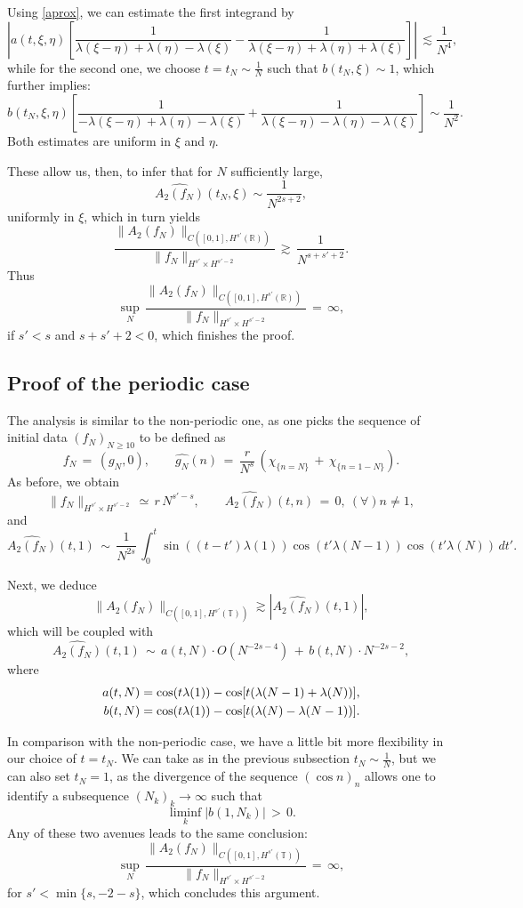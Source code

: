 \documentclass{amsart}
\begin{document}
Using \eqref{aprox}, we can estimate the first integrand by
\[
\left|a(t,\xi,\eta) \left[ \frac{1}{\lambda(\xi - \eta) + \lambda(\eta)- \lambda(\xi)} - \frac{1}{\lambda(\xi - \eta) + \lambda(\eta)+\lambda(\xi)} \right]\right|\,\lesssim \frac{1}{N^4}, 
\]
while for the second one, we choose $t=t_N \sim \frac{1}{N}$ such that $b(t_N,\xi) \sim 1$, which further implies:
\[
b(t_N,\xi,\eta) \left[ \frac{1}{-\lambda(\xi - \eta) + \lambda(\eta)-\lambda(\xi)} + \frac{1}{\lambda(\xi - \eta) - \lambda(\eta)-\lambda(\xi)} \right] \sim \frac{1}{N^2}.\]
Both estimates are uniform in $\xi$ and $\eta$.

These allow us, then, to infer that for $N$ sufficiently large,
\[
\widehat{A_2(f_N)}(t_N,\xi) \sim \frac{1}{N^{2s+2}},
\]
uniformly in $\xi$, which in turn yields
\[
\frac{\|A_2(f_N)\|_{C([0,1], H^{s'}(\mathbb{R}))}}{\|f_N\|_{H^{s'}\times H^{s'-2}}}\,\gtrsim\, \frac{1}{N^{s+s'+2}}.\]
Thus
\[
\sup_N\,\frac{\|A_2(f_N)\|_{C([0,1], H^{s'}(\mathbb{R}))}}{\|f_N\|_{H^{s'}\times H^{s'-2}}}\,=\,\infty,\]
if $s'<s$ and $s+s'+2<0$, which finishes the proof.

\subsection{Proof of the periodic case} The analysis is similar to the non-periodic one, as one picks the sequence of initial data $(f_N)_{N\geq 10}$ to be defined as
\begin{equation}
f_N\,=\,(g_N, 0), \qquad \widehat{g_N}(n)\,=\,\frac{r}{N^s} \,\left(\chi_{\{n=N\}}\,+\,\chi_{\{n=1-N\}}\right).
\label{fnp}
\end{equation}
As before, we obtain
\[
\|f_N\|_{H^{s'}\times H^{s'-2}}\,\simeq\,r\,N^{s'-s}, \qquad \widehat{A_2(f_N)}(t,n)\,=\,0, \ (\forall) n \neq 1,\]
and
\[
\widehat{A_2(f_N)}(t,1)\,\sim\,\frac{1}{N^{2s}}\,\int_0^t \sin((t-t') \lambda(1))\cos(t' \lambda(N-1))\cos(t'\lambda(N))\,dt'.
\]

Next, we deduce
\[
\|A_2(f_N)\|_{C([0,1], H^{s'}(\mathbb{T}))} \gtrsim \left|\widehat{A_2(f_N)}(t,1)\right|,
\]
which will be coupled with
\[
\widehat{A_2(f_N)}(t,1)\,\sim\,a(t,N)\cdot O(N^{-2s-4})\,+\,b(t,N)\cdot N^{-2s-2},
\]
where
\[\aligned
a(t,N)&= \cos (t\lambda(1))-\cos[t(\lambda(N-1) + \lambda(N))],\\ b(t,N)&= \cos (t\lambda(1))-\cos[t(\lambda(N) - \lambda(N-1))].
\endaligned
\]

In comparison with the non-periodic case, we have a little bit more flexibility in our choice of $t=t_N$. We can take as in the previous subsection $t_N \sim \frac{1}{N}$, but we can also set $t_N=1$, as the divergence of the sequence $(\cos n)_n$ allows one to identify a subsequence $(N_k)_k\to\infty$ such that 
\[
\liminf_k \left|b(1, N_k)\right|\,>\,0.
\]
Any of these two avenues leads to the same conclusion:
\[
\sup_N\,\frac{\|A_2(f_N)\|_{C([0,1], H^{s'}(\mathbb{T}))}}{\|f_N\|_{H^{s'}\times H^{s'-2}}}\,=\,\infty,\]
for $s'<\min\{s,-2-s\}$, which concludes this argument.
\end{document}
